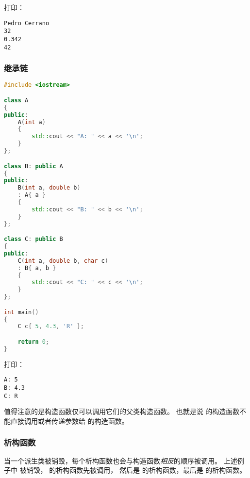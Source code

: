 \documentclass[../../LearnCpp.tex]{subfiles}
\begin{document}
打印：

\begin{lstlisting}
Pedro Cerrano
32
0.342
42
\end{lstlisting}

\subsubsection*{继承链}

\begin{lstlisting}[language=C++]
#include <iostream>

class A
{
public:
    A(int a)
    {
        std::cout << "A: " << a << '\n';
    }
};

class B: public A
{
public:
    B(int a, double b)
    : A{ a }
    {
        std::cout << "B: " << b << '\n';
    }
};

class C: public B
{
public:
    C(int a, double b, char c)
    : B{ a, b }
    {
        std::cout << "C: " << c << '\n';
    }
};

int main()
{
    C c{ 5, 4.3, 'R' };

    return 0;
}
\end{lstlisting}

打印：

\begin{lstlisting}
A: 5
B: 4.3
C: R
\end{lstlisting}

值得注意的是构造函数仅可以调用它们的父类构造函数。
也就是说  的构造函数不能直接调用或者传递参数给  的构造函数。

\subsubsection*{析构函数}

当一个派生类被销毁，每个析构函数也会与构造函数\textit{相反}的顺序被调用。
上述例子中  被销毁， 的析构函数先被调用，
然后是  的析构函数，最后是  的析构函数。
\end{document}
